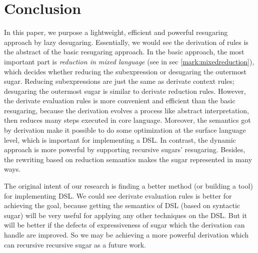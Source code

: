 \section{Conclusion}
\label{sec7}


In this paper, we purpose a lightweight, efficient and powerful resugaring approach by lazy desugaring. Essentially, we would see the derivation of rules is the abstract of the basic resugaring approach. In the basic approach, the most important part is \emph{reduction in mixed language} (see in sec \ref{mark:mixedreduction}), which decides whether reducing the subexpression or desugaring the outermost sugar. Reducing subexpressions are just the same as derivate context rules; desugaring the outermost sugar is similar to derivate reduction rules. However, the derivate evaluation rules is more convenient and efficient than the basic resugaring, because the derivation evolves a process like abstract interpretation\cite{AbstractInterpretation}, then reduces many steps executed in core language. Moreover, the semantics got by derivation make it possible to do some optimization at the surface language level, which is important for implementing a DSL. In contrast, the dynamic approach is more powerful by supporting recursive sugars' resugaring. Besides, the rewriting based on reduction semantics makes the sugar represented in many ways.

The original intent of our research is finding a better method (or building a tool) for implementing DSL. We could see derivate evaluation rules is better for achieving the goal, because getting the semantics of DSL (based on syntactic sugar) will be very useful for applying any other techniques on the DSL. But it will be better if the defects of expressiveness of sugar which the derivation can handle are improved. So we may be achieving a more powerful derivation which can recursive recursive sugar as a future work.

